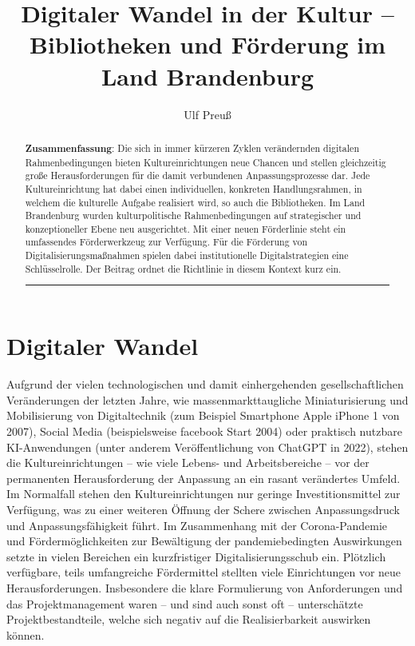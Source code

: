 \documentclass[a4paper,
fontsize=11pt,
oneside,
numbers=noperiodatend,
parskip=half-,
bibliography=totoc,
final
]{scrartcl}
\title{\LARGE{Digitaler Wandel in der Kultur – Bibliotheken und Förderung im Land Brandenburg}}%
\author{Ulf Preuß} %
\date{}
\begin{document}
\maketitle
\thispagestyle{fancyplain} 

\begin{abstract}
\noindent
\textbf{Zusammenfassung}: Die sich in immer kürzeren Zyklen verändernden
digitalen Rahmenbedingungen bieten Kultureinrichtungen neue Chancen und
stellen gleichzeitig große Herausforderungen für die damit verbundenen
Anpassungsprozesse dar. Jede Kultureinrichtung hat dabei einen
individuellen, konkreten Handlungsrahmen, in welchem die kulturelle
Aufgabe realisiert wird, so auch die Bibliotheken. Im Land Brandenburg
wurden kulturpolitische Rahmenbedingungen auf strategischer und
konzeptioneller Ebene neu ausgerichtet. Mit einer neuen Förderlinie
steht ein umfassendes Förderwerkzeug zur Verfügung. Für die Förderung
von Digitalisierungsmaßnahmen spielen dabei institutionelle
Digitalstrategien eine Schlüsselrolle. Der Beitrag ordnet die Richtlinie
in diesem Kontext kurz ein.

\begin{center}\rule{0.5\linewidth}{0.5pt}\end{center}
\end{abstract}

\section{Digitaler Wandel}\label{digitaler-wandel}

Aufgrund der vielen technologischen und damit einhergehenden
gesellschaftlichen Veränderungen der letzten Jahre, wie
massenmarkttaugliche Miniaturisierung und Mobilisierung von
Digitaltechnik (zum Beispiel Smartphone Apple iPhone 1 von 2007), Social
Media (beispielsweise facebook Start 2004) oder praktisch nutzbare
KI-Anwendungen (unter anderem Veröffentlichung von ChatGPT in 2022),
stehen die Kultureinrichtungen -- wie viele Lebens- und Arbeitsbereiche
-- vor der permanenten Herausforderung der Anpassung an ein rasant
verändertes Umfeld. Im Normalfall stehen den Kultureinrichtungen nur
geringe Investitionsmittel zur Verfügung, was zu einer weiteren Öffnung
der Schere zwischen Anpassungsdruck und Anpassungsfähigkeit führt. Im
Zusammenhang mit der Corona-Pandemie und Fördermöglichkeiten zur
Bewältigung der pandemiebedingten Auswirkungen setzte in vielen
Bereichen ein kurzfristiger Digitalisierungsschub ein. Plötzlich
verfügbare, teils umfangreiche Fördermittel stellten viele Einrichtungen
vor neue Herausforderungen. Insbesondere die klare Formulierung von
Anforderungen und das Projektmanagement waren -- und sind auch sonst oft
-- unterschätzte Projektbestandteile, welche sich negativ auf die
Realisierbarkeit auswirken können.
\end{document}
